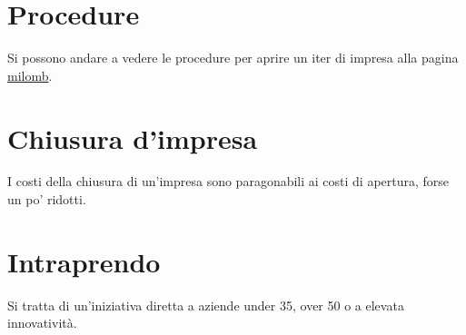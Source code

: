 \section{Procedure}
Si possono andare a vedere le procedure per aprire un iter di impresa alla pagina \href{milomb.camcom.it}{milomb}.

\section{Chiusura d'impresa}
I costi della chiusura di un'impresa sono paragonabili ai costi di apertura, forse un po' ridotti.

\section{Intraprendo}
Si tratta di un'iniziativa diretta a aziende under 35, over 50 o a elevata innovatività.




